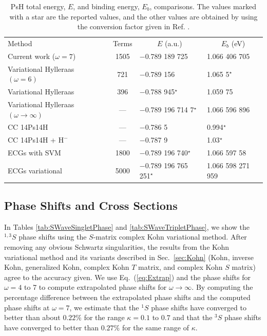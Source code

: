 \documentclass[preprint,showpacs,showkeys,preprintnumbers,amsmath,amssymb,longbibliography,pra,aps]{revtex4-1}
\newcommand*{\thead}[1]{\multicolumn{1}{c}{#1}}
\begin{document}
{\squeezetable  %
\begin{table}
\begin{center}
\begin{ruledtabular}  %
\begin{tabular}{l c l l}
Method & Terms & \thead{$E$ (a.u.)} & \thead{$E_b$ (eV)}\\
\colrule
Current work ($\omega = 7$) & 1505 & $-$0.789 189 725 & 1.066 406 705 \\
Variational Hylleraas $(\omega = 6)$ \cite{VanReeth2003} & 721 & $-$0.789 156 & 1.065 5$^\star$ \\
Variational Hylleraas \cite{Ho1986} & 396 & $-$0.788 945$^\star$ & 1.059 75 \\
Variational Hylleraas $(\omega \rightarrow \infty)$ \cite{Yan1999} & --- & $-$0.789 196 714 7$^\star$ & 1.066 596 896 \\
CC 14Ps14H \cite{Blackwood2002} & --- & $-$0.786 5 & 0.994$^\star$ \\
CC 14Ps14H + $\text{H}^-$ \cite{Walters2004} & --- & $-$0.787 9 & 1.03$^\star$\\
ECGs with SVM \cite{Mitroy2006} & 1800 & $-$0.789 196 740$^\star$ & 1.066 597 58 \\
ECGs variational \cite{Bubin2006} & 5000 & $-$0.789 196 765 251$^\star$ & 1.066 598 271 959 \\
\end{tabular}
\end{ruledtabular}
\caption{PsH total energy, $E$, and binding energy, $E_b$, comparisons.
The values marked with a star are the
reported values, and the other values are obtained by using the conversion
factor given in Ref. \cite{Mohr2012,*NISTConversions}.}
\label{tab:BoundEnergy}
\end{center}
\end{table}

\subsection{Phase Shifts and Cross Sections}
\label{sec:PhaseCross}

In Tables \ref{tab:SWaveSingletPhase} and \ref{tab:SWaveTripletPhase}, we 
show the $^{1,3}S$ phase shifts using the $S$-matrix complex Kohn 
variational method. After removing any obvious Schwartz singularities, the
results from the Kohn variational method and its variants
described in Sec.~\ref{sec:Kohn} (Kohn, inverse Kohn, generalized Kohn,
complex Kohn $T$ matrix, and complex Kohn $S$ matrix) agree
to the accuracy given.
We use Eq.~(\ref{eq:Extrap}) and the phase shifts for $\omega = 4$ to 7 to
compute extrapolated phase shifts for $\omega \rightarrow \infty$.
By computing the percentage difference between the
extrapolated phase shifts and the computed phase shifts at $\omega=7$, we
estimate that the $^1S$ phase shifts have converged to better than about
$0.22\%$ for the range $\kappa=0.1$ to $0.7$ and that the $^3S$ phase shifts
have converged to better than $0.27\%$ for the same range of $\kappa$.

}
\end{document}
